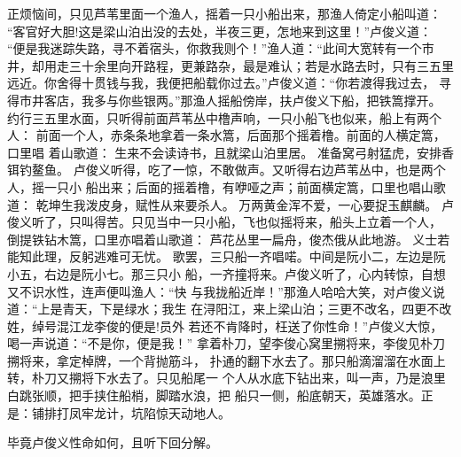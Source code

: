正烦恼间，只见芦苇里面一个渔人，摇着一只小船出来，那渔人倚定小船叫道：
“客官好大胆!这是梁山泊出没的去处，半夜三更，怎地来到这里！”卢俊义道：
“便是我迷踪失路，寻不着宿头，你救我则个！”渔人道：“此间大宽转有一个市
井，却用走三十余里向开路程，更兼路杂，最是难认；若是水路去时，只有三五里
远近。你舍得十贯钱与我，我便把船载你过去。”卢俊义道：“你若渡得我过去，
寻得市井客店，我多与你些银两。”那渔人摇船傍岸，扶卢俊义下船，把铁篙撑开。
约行三五里水面，只听得前面芦苇丛中橹声响，一只小船飞也似来，船上有两个人：
前面一个人，赤条条地拿着一条水篙，后面那个摇着橹。前面的人横定篙，口里唱
着山歌道：
生来不会读诗书，且就梁山泊里居。
准备窝弓射猛虎，安排香铒钓鳌鱼。
卢俊义听得，吃了一惊，不敢做声。又听得右边芦苇丛中，也是两个人，摇一只小
船出来；后面的摇着橹，有咿哑之声；前面横定篙，口里也唱山歌道：
乾坤生我泼皮身，赋性从来要杀人。
万两黄金浑不爱，一心要捉玉麒麟。
卢俊义听了，只叫得苦。只见当中一只小船，飞也似摇将来，船头上立着一个人，
倒提铁钻木篙，口里亦唱着山歌道：
芦花丛里一扁舟，俊杰俄从此地游。
义士若能知此理，反躬逃难可无忧。
歌罢，三只船一齐唱喏。中间是阮小二，左边是阮小五，右边是阮小七。那三只小
船，一齐撞将来。卢俊义听了，心内转惊，自想又不识水性，连声便叫渔人：“快
与我拢船近岸！”那渔人哈哈大笑，对卢俊义说道：“上是青天，下是绿水；我生
在浔阳江，来上梁山泊；三更不改名，四更不改姓，绰号混江龙李俊的便是!员外
若还不肯降时，枉送了你性命！”卢俊义大惊，喝一声说道：“不是你，便是我！”
拿着朴刀，望李俊心窝里搠将来，李俊见朴刀搠将来，拿定棹牌，一个背抛筋斗，
扑通的翻下水去了。那只船滴溜溜在水面上转，朴刀又搠将下水去了。只见船尾一
个人从水底下钻出来，叫一声，乃是浪里白跳张顺，把手挟住船梢，脚踏水浪，把
船只一侧，船底朝天，英雄落水。正是：铺排打凤牢龙计，坑陷惊天动地人。

毕竟卢俊义性命如何，且听下回分解。
